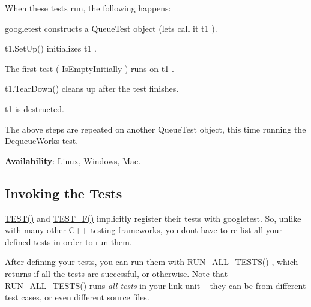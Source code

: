 When these tests run, the following happens\+:


\begin{DoxyEnumerate}
\item googletest constructs a {\ttfamily Queue\+Test} object (let\textquotesingle{}s call it {\ttfamily t1} ).
\end{DoxyEnumerate}
\begin{DoxyEnumerate}
\item {\ttfamily t1.\+Set\+Up()} initializes {\ttfamily t1} .
\end{DoxyEnumerate}
\begin{DoxyEnumerate}
\item The first test ( {\ttfamily Is\+Empty\+Initially} ) runs on {\ttfamily t1} .
\end{DoxyEnumerate}
\begin{DoxyEnumerate}
\item {\ttfamily t1.\+Tear\+Down()} cleans up after the test finishes.
\end{DoxyEnumerate}
\begin{DoxyEnumerate}
\item {\ttfamily t1} is destructed.
\end{DoxyEnumerate}
\begin{DoxyEnumerate}
\item The above steps are repeated on another {\ttfamily Queue\+Test} object, this time running the {\ttfamily Dequeue\+Works} test.
\end{DoxyEnumerate}

{\bfseries{Availability}}\+: Linux, Windows, Mac.

\subsection*{Invoking the Tests}

{\ttfamily \mbox{\hyperlink{googletest-master_2googletest_2include_2gtest_2gtest_8h_ab5540a6d621853916be8240ff51819cf}{T\+E\+S\+T()}}} and {\ttfamily \mbox{\hyperlink{googletest-master_2googletest_2include_2gtest_2gtest_8h_a0ee66d464d1a06c20c1929cae09d8758}{T\+E\+S\+T\+\_\+\+F()}}} implicitly register their tests with googletest. So, unlike with many other C++ testing frameworks, you don\textquotesingle{}t have to re-\/list all your defined tests in order to run them.

After defining your tests, you can run them with {\ttfamily \mbox{\hyperlink{googletest-master_2googletest_2include_2gtest_2gtest_8h_a853a3792807489591d3d4a2f2ff9359f}{R\+U\+N\+\_\+\+A\+L\+L\+\_\+\+T\+E\+S\+T\+S()}}} , which returns {} if all the tests are successful, or {} otherwise. Note that {\ttfamily \mbox{\hyperlink{googletest-master_2googletest_2include_2gtest_2gtest_8h_a853a3792807489591d3d4a2f2ff9359f}{R\+U\+N\+\_\+\+A\+L\+L\+\_\+\+T\+E\+S\+T\+S()}}} runs {\itshape all tests} in your link unit -- they can be from different test cases, or even different source files.

